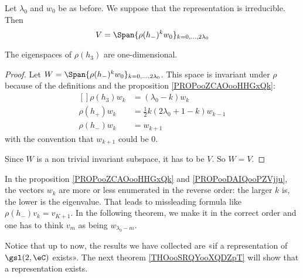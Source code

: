 \begin{proposition}     \label{PROPooDAIQooPZVjju}
    Let \( \lambda_0\) and \( w_0\) be as before. We suppose that the representation is irreducible. Then
    \begin{equation}
        V=\Span\{  \rho(h_-)^kw_0 \}_{k=0,\ldots, 2\lambda_0}
    \end{equation}

    The eigenspaces of \( \rho(h_3)\) are one-dimensional.
\end{proposition}

\begin{proof}
    Let \(  W=\Span\{  \rho(h_-)^kw_0 \}_{k=0,\ldots, 2\lambda_0}\). This space is invariant under \( \rho\) because of the definitions and the proposition \ref{PROPooZCAOooHHGxQk}:
    \begin{equation}
        \begin{aligned}[]
            \rho(h_3)w_k&=(\lambda_0-k)w_k\\
            \rho(h_+)w_k&=\frac{ 1 }{2}k(2\lambda_0+1-k)w_{k-1}\\
            \rho(h_-)w_k&=w_{k+1}
        \end{aligned}
    \end{equation}
    with the convention that \( w_{k+1}\) could be \( 0\).   

    Since \( W\) is a non trivial invariant subspace, it has to be \( V\). So \( W=V\).
\end{proof}

\begin{normaltext}
In the proposition \ref{PROPooZCAOooHHGxQk} and \ref{PROPooDAIQooPZVjju}, the vectors \( w_k\) are more or less enumerated in the reverse order: the larger \( k\) is, the lower is the eigenvalue. That leads to missleading formula like \( \rho(h_-)v_k=v_{K+1}\). In the following theorem, we make it in the correct order and one has to think \( v_m\) as being \( w_{\lambda_0-m}\).

Notice that up to now, the results we have collected are «if a representation of \( \gsl(2,\eC)\) exists». The next theorem \ref{THOooSRQYooXQDZpT} will show that a representation exists.
\end{normaltext}

